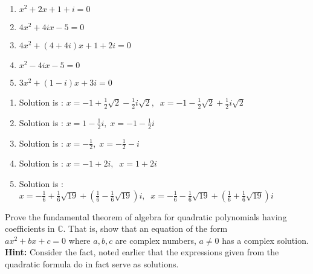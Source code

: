 \begin{enumialphparenastyle}
\begin{ex}
\begin{enumerate}
\item $x^{2}+2x+1+i=0$

\item $4x^{2}+4ix-5=0$

\item $4x^{2}+\left( 4+4i\right) x+1+2i=0$

\item $x^{2}-4ix-5=0$

\item $3x^{2}+\left( 1-i\right) x+3i=0$
\end{enumerate}
\begin{sol}
\begin{enumerate}
\item Solution is : $x=-1+\frac{1}{2}\sqrt{2}-\frac{1}{2}i
\sqrt{2},\;\;x=-1-\frac{1}{2}\sqrt{2}+\frac{1}{2}i\sqrt{2}$
\item Solution is : $x=1-\frac{1}{2}i,\;x=-1-\frac{1}{2}i$
\item Solution is : $x=-\frac{1}{2},\;x=-\frac{1}{2}-i$
\item Solution is : $x=-1+2i,\;\;x=1+2i$
\item Solution is : $x=-\frac{1}{6}+\frac{1}{6}\sqrt{19}+\left( \frac{1}{6}-\frac{1}{6}\sqrt{19}\right) i,\;\;x=-\frac{1}{6}-\frac{1}{6}\sqrt{19}+\left( \frac{1}{6}+\frac{1}{6}\sqrt{19}\right)i$
\end{enumerate}
\end{sol}
\end{ex}



\begin{ex} \label{exercomplex3}Prove the fundamental theorem of algebra for
quadratic polynomials having coefficients in $\mathbb{C}$. That is, show
that an equation of the form \\ $ax^{2}+bx+c=0$ where $a,b,c$ are complex
numbers, $a\neq 0$ has a complex solution. \textbf{Hint: }Consider the fact,
noted earlier that the expressions given from the quadratic formula do in
fact serve as solutions. 
\end{ex}

\end{enumialphparenastyle}